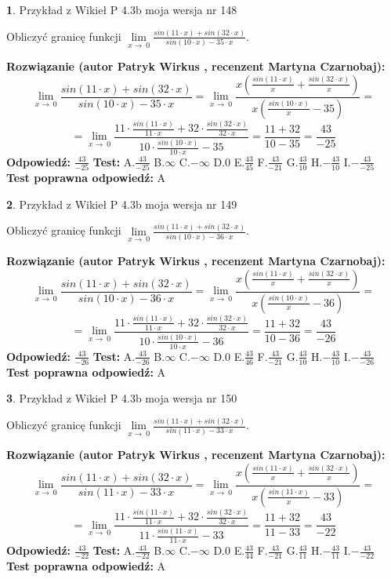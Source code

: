\documentclass[12pt, a4paper]{article}
\theoremstyle{definition} %
\newtheorem{zad}{}
\newcommand{\zadStart}[1]{\begin{zad}#1\newline}
\newcommand{\zadStop}{\end{zad}}
\newcommand{\rozwStart}[2]{\noindent \textbf{Rozwiązanie (autor #1 , recenzent #2): }\newline}
\newcommand{\rozwStop}{\newline}
\newcommand{\odpStart}{\noindent \textbf{Odpowiedź:}\newline}
\newcommand{\odpStop}{\newline}
\newcommand{\testStart}{\noindent \textbf{Test:}\newline}
\newcommand{\testStop}{\newline}
\newcommand{\kluczStart}{\noindent \textbf{Test poprawna odpowiedź:}\newline}
\newcommand{\kluczStop}{\newline}
\begin{document}
\zadStart{Przykład z Wikieł P 4.3b moja wersja nr 148}


Obliczyć granicę funkcji $\lim\limits_{x\to\ 0}\frac{sin(11 \cdot x)+sin(32 \cdot x)}{sin(10 \cdot x)-35 \cdot x}$.
\zadStop
\rozwStart{Patryk Wirkus}{Martyna Czarnobaj}
$$\lim\limits_{x\to\ 0}\frac{sin(11 \cdot x)+sin(32 \cdot x)}{sin(10 \cdot x)-35 \cdot x}=\lim\limits_{x\to\ 0}\frac{x(\frac{sin(11 \cdot x)}{x}+\frac{sin(32 \cdot x)}{x})}{x(\frac{sin(10 \cdot x)}{x}-35)}=$$
$$=\lim\limits_{x\to\ 0}\frac{11 \cdot \frac{sin(11 \cdot x)}{11 \cdot x}+32 \cdot \frac{sin(32 \cdot x)}{32 \cdot x}}{10 \cdot \frac{sin(10 \cdot x)}{10 \cdot x}-35}=\frac{11+32}{10-35} = \frac{43}{-25}$$
\rozwStop
\odpStart
$\frac{43}{-25}$
\odpStop
\testStart
A.$\frac{43}{-25}$
B.$\infty$
C.$-\infty$
D.$0$
E.$\frac{43}{45}$
F.$\frac{43}{-21}$
G.$\frac{43}{10}$
H.$-\frac{43}{10}$
I.$-\frac{43}{-25}$
\testStop
\kluczStart
A
\kluczStop



\zadStart{Przykład z Wikieł P 4.3b moja wersja nr 149}


Obliczyć granicę funkcji $\lim\limits_{x\to\ 0}\frac{sin(11 \cdot x)+sin(32 \cdot x)}{sin(10 \cdot x)-36 \cdot x}$.
\zadStop
\rozwStart{Patryk Wirkus}{Martyna Czarnobaj}
$$\lim\limits_{x\to\ 0}\frac{sin(11 \cdot x)+sin(32 \cdot x)}{sin(10 \cdot x)-36 \cdot x}=\lim\limits_{x\to\ 0}\frac{x(\frac{sin(11 \cdot x)}{x}+\frac{sin(32 \cdot x)}{x})}{x(\frac{sin(10 \cdot x)}{x}-36)}=$$
$$=\lim\limits_{x\to\ 0}\frac{11 \cdot \frac{sin(11 \cdot x)}{11 \cdot x}+32 \cdot \frac{sin(32 \cdot x)}{32 \cdot x}}{10 \cdot \frac{sin(10 \cdot x)}{10 \cdot x}-36}=\frac{11+32}{10-36} = \frac{43}{-26}$$
\rozwStop
\odpStart
$\frac{43}{-26}$
\odpStop
\testStart
A.$\frac{43}{-26}$
B.$\infty$
C.$-\infty$
D.$0$
E.$\frac{43}{46}$
F.$\frac{43}{-21}$
G.$\frac{43}{10}$
H.$-\frac{43}{10}$
I.$-\frac{43}{-26}$
\testStop
\kluczStart
A
\kluczStop



\zadStart{Przykład z Wikieł P 4.3b moja wersja nr 150}


Obliczyć granicę funkcji $\lim\limits_{x\to\ 0}\frac{sin(11 \cdot x)+sin(32 \cdot x)}{sin(11 \cdot x)-33 \cdot x}$.
\zadStop
\rozwStart{Patryk Wirkus}{Martyna Czarnobaj}
$$\lim\limits_{x\to\ 0}\frac{sin(11 \cdot x)+sin(32 \cdot x)}{sin(11 \cdot x)-33 \cdot x}=\lim\limits_{x\to\ 0}\frac{x(\frac{sin(11 \cdot x)}{x}+\frac{sin(32 \cdot x)}{x})}{x(\frac{sin(11 \cdot x)}{x}-33)}=$$
$$=\lim\limits_{x\to\ 0}\frac{11 \cdot \frac{sin(11 \cdot x)}{11 \cdot x}+32 \cdot \frac{sin(32 \cdot x)}{32 \cdot x}}{11 \cdot \frac{sin(11 \cdot x)}{11 \cdot x}-33}=\frac{11+32}{11-33} = \frac{43}{-22}$$
\rozwStop
\odpStart
$\frac{43}{-22}$
\odpStop
\testStart
A.$\frac{43}{-22}$
B.$\infty$
C.$-\infty$
D.$0$
E.$\frac{43}{44}$
F.$\frac{43}{-21}$
G.$\frac{43}{11}$
H.$-\frac{43}{11}$
I.$-\frac{43}{-22}$
\testStop
\kluczStart
A
\kluczStop
\end{document}
